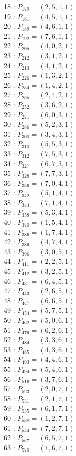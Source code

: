 \documentclass{article}
\begin{document}
{\begin{multicols}{2}
18 : $P_{179}=( 2, 5, 1, 1 )$\\
19 : $P_{181}=( 4, 5, 1, 1 )$\\
20 : $P_{189}=( 4, 6, 1, 1 )$\\
21 : $P_{192}=( 7, 6, 1, 1 )$\\
22 : $P_{205}=( 4, 0, 2, 1 )$\\
23 : $P_{212}=( 3, 1, 2, 1 )$\\
24 : $P_{213}=( 4, 1, 2, 1 )$\\
25 : $P_{226}=( 1, 3, 2, 1 )$\\
26 : $P_{234}=( 1, 4, 2, 1 )$\\
27 : $P_{235}=( 2, 4, 2, 1 )$\\
28 : $P_{252}=( 3, 6, 2, 1 )$\\
29 : $P_{271}=( 6, 0, 3, 1 )$\\
30 : $P_{286}=( 5, 2, 3, 1 )$\\
31 : $P_{300}=( 3, 4, 3, 1 )$\\
32 : $P_{310}=( 5, 5, 3, 1 )$\\
33 : $P_{312}=( 7, 5, 3, 1 )$\\
34 : $P_{327}=( 6, 7, 3, 1 )$\\
35 : $P_{328}=( 7, 7, 3, 1 )$\\
36 : $P_{336}=( 7, 0, 4, 1 )$\\
37 : $P_{342}=( 5, 1, 4, 1 )$\\
38 : $P_{344}=( 7, 1, 4, 1 )$\\
39 : $P_{358}=( 5, 3, 4, 1 )$\\
40 : $P_{370}=( 1, 5, 4, 1 )$\\
41 : $P_{386}=( 1, 7, 4, 1 )$\\
42 : $P_{389}=( 4, 7, 4, 1 )$\\
43 : $P_{396}=( 3, 0, 5, 1 )$\\
44 : $P_{411}=( 2, 2, 5, 1 )$\\
45 : $P_{412}=( 3, 2, 5, 1 )$\\
46 : $P_{431}=( 6, 4, 5, 1 )$\\
47 : $P_{443}=( 2, 6, 5, 1 )$\\
48 : $P_{447}=( 6, 6, 5, 1 )$\\
49 : $P_{454}=( 5, 7, 5, 1 )$\\
50 : $P_{462}=( 5, 0, 6, 1 )$\\
51 : $P_{479}=( 6, 2, 6, 1 )$\\
52 : $P_{484}=( 3, 3, 6, 1 )$\\
53 : $P_{485}=( 4, 3, 6, 1 )$\\
54 : $P_{493}=( 4, 4, 6, 1 )$\\
55 : $P_{494}=( 5, 4, 6, 1 )$\\
56 : $P_{516}=( 3, 7, 6, 1 )$\\
57 : $P_{523}=( 2, 0, 7, 1 )$\\
58 : $P_{531}=( 2, 1, 7, 1 )$\\
59 : $P_{535}=( 6, 1, 7, 1 )$\\
60 : $P_{538}=( 1, 2, 7, 1 )$\\
61 : $P_{544}=( 7, 2, 7, 1 )$\\
62 : $P_{567}=( 6, 5, 7, 1 )$\\
63 : $P_{570}=( 1, 6, 7, 1 )$\\
\end{multicols}
}
\end{document}
